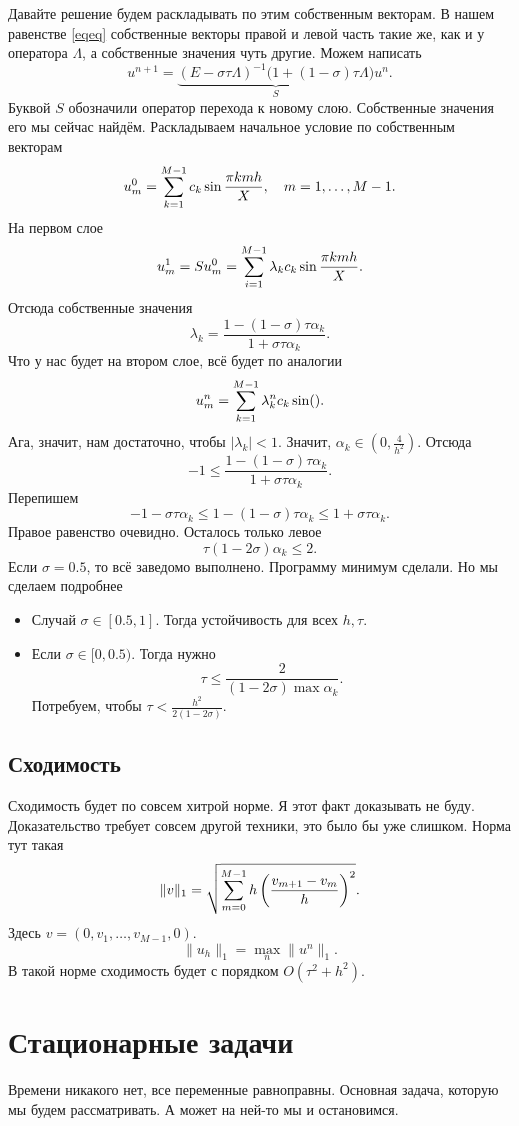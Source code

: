 Давайте решение будем раскладывать по этим собственным векторам. В нашем равенстве \eqref{eqeq} собственные векторы правой и левой часть такие же, как и у оператора $\Lambda$, а собственные значения чуть другие. Можем написать
\[
  u^{n+1} = \underbrace{(E-\sigma\tau \Lambda)^{-1}\big(1+(1-\sigma)\tau\Lambda\big)}_S u^n.
\]
Буквой $S$ обозначили оператор перехода к новому слою. Собственные значения его мы сейчас найдём. Раскладываем начальное условие по собственным векторам
\[
  u_m^0 = \sum\limits_{k = 1}^{M-1} c_k \sin\frac{\pi kmh}X,\quad m=1,\dots,M-1.
\]
На первом слое
\[
  u_m^1 = S u_m^0 = \sum\limits_{i = 1}^{M-1} \lambda_k c_k\sin\frac{\pi k m h}X.
\]
Отсюда собственные значения
\[
  \lambda_k = \frac{1-(1-\sigma)\tau\alpha_k}{1+\sigma\tau\alpha_k}.
\]
Что у нас будет на втором слое, всё будет по аналогии
\[
  u_m^n = \sum\limits_{k = 1}^{M-1} \lambda_k^n c_k \sin().
\]
Ага, значит, нам достаточно, чтобы $|\lambda_k|<1$. Значит, $\alpha_k\in\left(0,\frac4{h^2}\right)$. Отсюда
\[
  -1\le \frac{1-(1-\sigma)\tau\alpha_k}{1 + \sigma\tau\alpha_k}.
\]
Перепишем
\[
  -1 - \sigma\tau\alpha_k\le 1- (1-\sigma)\tau\alpha_k\le 1+\sigma\tau\alpha_k.
\]
Правое равенство очевидно. Осталось только левое
\[
  \tau(1-2\sigma)\alpha_k\le 2.
\]
Если $\sigma=0.5$, то всё заведомо выполнено. Программу минимум сделали. Но мы сделаем подробнее
\begin{itemize}
\item Случай $\sigma\in[0.5,1]$. Тогда устойчивость для всех $h,\tau$.
\item Если $\sigma\in[0,0.5)$. Тогда нужно
\[
  \tau\le \frac2{(1-2\sigma)\max\alpha_k}.
\]
Потребуем, чтобы $\tau < \frac{h^2}{2(1-2\sigma)}$.
\end{itemize}

\subsection{Сходимость}
Сходимость будет по совсем хитрой норме. Я этот факт доказывать не буду. Доказательство требует совсем другой техники, это было бы уже слишком. Норма тут такая
\[
  \|v\|_1 = \sqrt{\sum\limits_{m = 0}^{M-1}h\left( \frac{v_{m+1} - v_m}h \right)^2}.
\]
Здесь $v = (0,v_1,\dots,v_{M-1},0)$.
\[
  \|u_h\|_1 = \max\limits_n\|u^n\|_1.
\]
В такой норме сходимость будет с порядком $O(\tau^2+h^2)$.

\section{Стационарные задачи}
Времени никакого нет, все переменные равноправны. Основная задача, которую мы будем рассматривать. А может на ней-то мы и остановимся.

